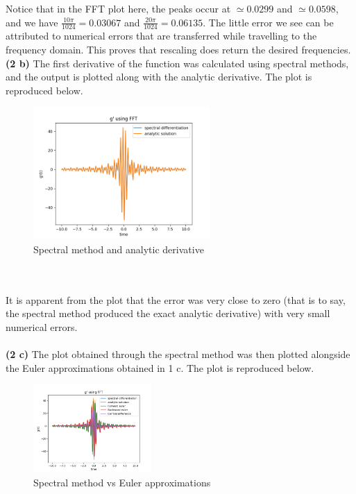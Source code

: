 \documentclass[12pt]{article}
\begin{document}
Notice that in the FFT plot here, the peaks occur at $\simeq 0.0299$ and $\simeq 0.0598$, and we have $\frac{10\pi}{1024} = 0.03067$ and $\frac{20\pi}{1024} = 0.06135$. The little error we see can be attributed to numerical errors that are transferred while travelling to the frequency domain. This proves that rescaling does return the desired frequencies. \\
\textbf{(2 b)} The first derivative of the function was calculated using spectral methods, and the output is plotted along with the analytic derivative. The plot is reproduced below. 
\begin{figure}[h]
	\centering
	\includegraphics[width=0.60\textwidth]{fftanalyticcomparison.png}
	\caption{Spectral method and analytic derivative}
 \end{figure}\\\\
It is apparent from the plot that the error was very close to zero (that is to say, the spectral method produced the exact analytic derivative) with very small numerical errors. \\\\
\textbf{(2 c)} The plot obtained through the spectral method was then plotted alongside the Euler approximations obtained in 1 c. The plot is reproduced below. \\ 
\begin{figure}[h]
	\centering
	\includegraphics[width=0.40\textwidth]{eulerfftcomparison.png}
	\caption{Spectral method vs Euler approximations}
\end{figure}\\\\
\end{document}

